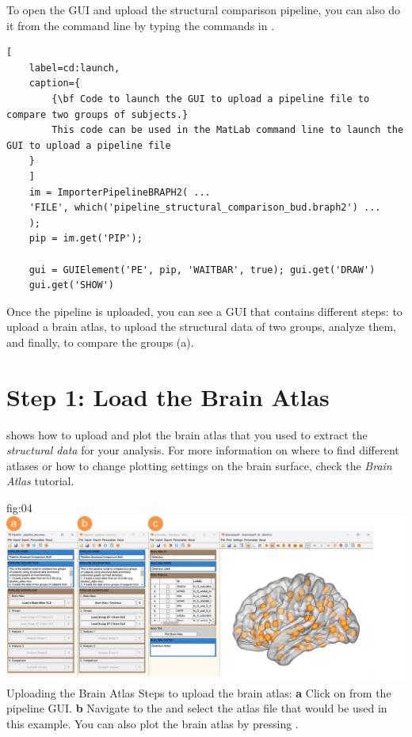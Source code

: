 \documentclass[justified]{tufte-handout}
\begin{document}
\begin{tcolorbox}[
	title=Pipeline launch from command line
	]
	To open the GUI and upload the structural comparison pipeline, you can also do it from the command line by typing the commands in .

\begin{lstlisting}[
	label=cd:launch,
	caption={
		{\bf Code to launch the GUI to upload a pipeline file to compare two groups of subjects.}
		This code can be used in the MatLab command line to launch the GUI to upload a pipeline file
	}
	]
	im = ImporterPipelineBRAPH2( ...
	'FILE', which('pipeline_structural_comparison_bud.braph2') ...
	);
	pip = im.get('PIP');
	
	gui = GUIElement('PE', pip, 'WAITBAR', true); gui.get('DRAW')
	gui.get('SHOW')
\end{lstlisting}
\end{tcolorbox}


Once the pipeline is uploaded, you can see a GUI that contains different steps: to upload a brain atlas, to upload the structural data of two groups, analyze them, and finally, to compare the groups (a). 

\section{Step 1: Load the Brain Atlas}
 shows how to upload and plot the brain atlas that you used to extract the \emph{structural data} for your analysis. For more information on where to find different atlases or how to change plotting settings on the brain surface, check the \emph{Brain Atlas} tutorial.

	{fig:04}
	{
	\includegraphics{fig04.jpg}
	}
	{Uploading the Brain Atlas}
	{
	Steps to upload the brain atlas:
	{\bf a} Click on  from the pipeline GUI.
	{\bf b} Navigate to the  and select the atlas file  that would be used in this example. You can also plot the brain atlas by pressing . 
	}
 
\end{document}
